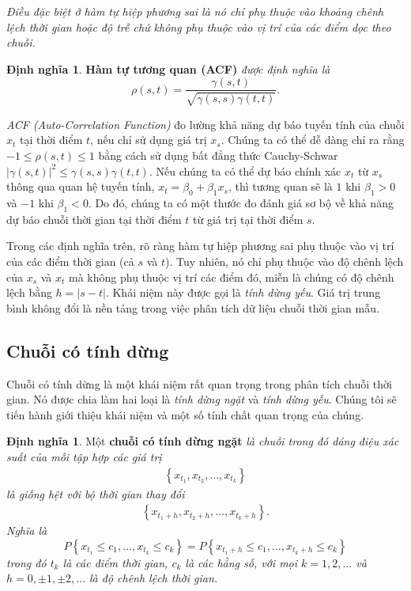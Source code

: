 \documentclass[12pt, a4paper,oneside]{book}
\theoremstyle{definition}
\newtheorem{dn}[theo]{Định nghĩa}
\begin{document}
\textit{Điều đặc biệt ở hàm tự hiệp phương sai là nó chỉ phụ thuộc vào khoảng chênh lệch thời gian hoặc độ trễ chứ không phụ thuộc vào vị trí của các điểm dọc theo chuỗi.}
\begin{dn}\cite{1} \textbf{Hàm tự tương quan (ACF)} \textit{được định nghĩa là
\begin{equation}
\rho(s,t) = \dfrac{\gamma(s,t)}{\sqrt{\gamma(s,s)\gamma(t,t)}}. \label{ct1.13}
\end{equation}}
\end{dn}
\textit{ACF (Auto-Correlation Function)} đo lường khả năng dự báo tuyến tính của chuỗi $x_t$ tại thời điểm $t$, nếu chỉ sử dụng giá trị $x_s$. Chúng ta có thể dễ dàng chỉ ra rằng $-1 \leqslant \rho(s,t)\leqslant 1$ bằng cách sử dụng bất đẳng thức Cauchy-Schwar $\left| \gamma(s,t)\right|^{2}\leqslant\gamma(s,s)\gamma(t,t).$ Nếu chúng ta có thể dự báo chính xác $x_t$ từ $x_s$ thông qua quan hệ tuyến tính, $x_t=\beta_0+\beta_1 x_s$, thì tương quan sẽ là $1$ khi $\beta_1>0$ và $-1$ khi $\beta_1<0$. Do đó, chúng ta có một thước đo đánh giá sơ bộ về khả năng dự báo chuỗi thời gian tại thời điểm $t$ từ giá trị tại thời điểm $s$. 

Trong các định nghĩa trên, rõ ràng hàm tự hiệp phương sai phụ thuộc vào vị trí của các điểm thời gian (cả $s$ và $t$). Tuy nhiên, nó chỉ phụ thuộc vào độ chênh lệch của $x_{s}$ và $x_{t}$ mà không phụ thuộc vị trí các điểm đó, miễn là chúng có độ chênh lệch bằng $h= \lvert s-t\lvert$. Khái niệm này được gọi là \textit{tính dừng yếu}. Giá trị trung bình không đổi là nền tảng trong việc phân tích dữ liệu chuỗi thời gian mẫu.

\subsection{Chuỗi có tính dừng}

Chuỗi có tính dừng là một khái niệm rất quan trọng trong phân tích chuỗi thời gian. Nó được chia làm hai loại là \textit{tính dừng ngặt} và \textit{tính dừng yếu}. Chúng tôi sẽ tiến hành giới thiệu khái niệm và một số tính chất quan trọng của chúng.
\begin{dn}\cite{1, 2} \label{dn1.6}Một \textbf{chuỗi có tính dừng ngặt} \textit{là chuỗi trong đó dáng điệu xác suất của mỗi tập hợp các giá trị
		\begin{align*}
		\left\lbrace x_{t_{1}}, x_{t_{2}}, \dots, x_{t_{k}}\right\rbrace
		\end{align*}
		là giống hệt với bộ thời gian thay đổi
		\begin{align*}
		\left\lbrace x_{t_{1}+h}, x_{t_{2}+h}, \dots, x_{t_{k}+h}\right\rbrace.
		\end{align*}
		Nghĩa là 
		\begin{equation}
		P\left\lbrace x_{t_{1}}\leqslant c_{1}, \dots, x_{t_{k}}\leqslant c_{k}\right\rbrace = P\left\lbrace x_{t_{1}+h}\leqslant c_{1}, \dots, x_{t_{k}+h}\leqslant c_{k}\right\rbrace \label{ct1.19}
		\end{equation}
		trong đó $t_{k}$ là các điểm thời gian, $c_{k}$ là các hằng số, với mọi $k=1, 2, \dots$ và $h=0, \pm1, \pm2, \dots$ là độ chênh lệch thời gian.} 
\end{dn}
\end{document}
